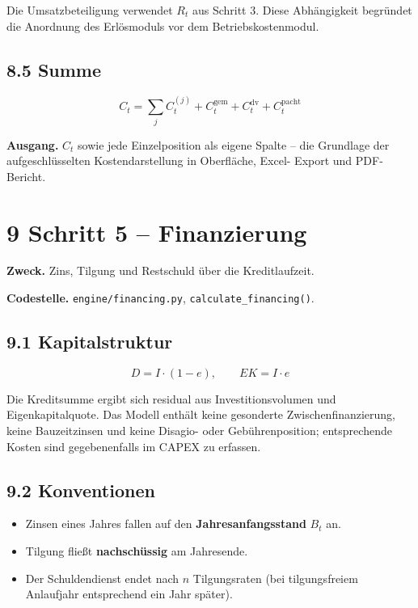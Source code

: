 \documentclass[
  a4paper,
  10pt]{article}
\providecommand{\tightlist}{%
  \setlength{\itemsep}{0pt}\setlength{\parskip}{0pt}}
\renewenvironment{quote}
  {\begin{tcolorbox}[
      enhanced,
      breakable,
      colback=Wash,
      colframe=Brand,
      boxrule=0pt,
      leftrule=2.2pt,
      arc=0pt,
      left=8pt,right=8pt,top=6pt,bottom=6pt,
      before skip=8pt,after skip=9pt
    ]\small\color{InkSoft}}
  {\end{tcolorbox}}
\begin{document}
\begin{quote}
Die Umsatzbeteiligung verwendet \(R_t\) aus Schritt 3. Diese
Abhängigkeit begründet die Anordnung des Erlösmoduls vor dem
Betriebskostenmodul.
\end{quote}

\hypertarget{summe}{%
\subsection{8.5 Summe}\label{summe}}

\[ C_t = \sum_j C^{(j)}_t + C^{\mathrm{gem}}_t + C^{\mathrm{dv}}_t + C^{\mathrm{pacht}}_t \]

\textbf{Ausgang.} \(C_t\) sowie jede Einzelposition als eigene Spalte --
die Grundlage der aufgeschlüsselten Kostendarstellung in Oberfläche,
Excel- Export und PDF-Bericht.

\hypertarget{schritt-5-finanzierung}{%
\section{9 Schritt 5 -- Finanzierung}\label{schritt-5-finanzierung}}

\textbf{Zweck.} Zins, Tilgung und Restschuld über die Kreditlaufzeit.

\textbf{Codestelle.} \nolinkurl{engine/financing.py},
\texttt{calculate\_financing()}.

\hypertarget{kapitalstruktur}{%
\subsection{9.1 Kapitalstruktur}\label{kapitalstruktur}}

\[ D = I \cdot (1 - e), \qquad EK = I \cdot e \]

Die Kreditsumme ergibt sich residual aus Investitionsvolumen und
Eigenkapitalquote. Das Modell enthält keine gesonderte
Zwischenfinanzierung, keine Bauzeitzinsen und keine Disagio- oder
Gebührenposition; entsprechende Kosten sind gegebenenfalls im CAPEX zu
erfassen.

\hypertarget{konventionen}{%
\subsection{9.2 Konventionen}\label{konventionen}}

\begin{itemize}
\tightlist
\item
  Zinsen eines Jahres fallen auf den \textbf{Jahresanfangsstand} \(B_t\)
  an.
\item
  Tilgung fließt \textbf{nachschüssig} am Jahresende.
\item
  Der Schuldendienst endet nach \(n\) Tilgungsraten (bei tilgungsfreiem
  Anlaufjahr entsprechend ein Jahr später).
\end{itemize}
\end{document}
